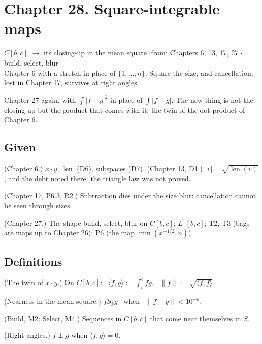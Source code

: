 \newpage

\section*{Chapter 28. Square-integrable maps}
\begin{center}
{\normalsize $C[b,c]$ $\to$ its closing-up in the mean square \quad$\cdot$\quad from: Chapters 6, 13, 17, 27 \quad$\cdot$\quad build, select, blur}\\[4pt]
{\small Chapter 6 with a stretch in place of $\{1, \dots, n\}$. Square the size, and cancellation, lost in Chapter 17, survives at right angles.}
\end{center}

Chapter 27 again, with $\int |f - g|^2$ in place of $\int |f - g|$. The new thing is not the closing-up but the product that comes with it: the twin of the dot product of Chapter 6.

\subsection*{Given}

\begin{lines}
\item[\lab{G1}] (Chapter 6.) $x \cdot y$, $\operatorname{len}$ (D6), subspaces (D7). (Chapter 13, D1.) $|v| = \sqrt{\operatorname{len}(v)}$, and the debt noted there: the triangle law was not proved.
\item[\lab{G2}] (Chapter 17, P6.3, R2.) Subtraction dies under the size blur: cancellation cannot be seen through sizes.
\item[\lab{G3}] (Chapter 27.) The shape build, select, blur on $C[b,c]$; $L^1[b,c]$; T2, T3 (bags are maps up to Chapter 26); P6 (the map $\min(x^{-1/2}, n)$).
\end{lines}

\subsection*{Definitions}

\begin{lines}
\item[\lab{D1}] (The twin of $x \cdot y$.) On $C[b,c]$: \ $\langle f, g \rangle := \int_b^c f g$. \ $\|f\| := \sqrt{\langle f, f \rangle}$.
\item[\lab{D2}] (Nearness in the mean square.) $f \mathrel{S_k} g$ \ when \ $\|f - g\| < 10^{-k}$.
\item[\lab{D3}] (Build, M2; Select, M4.) Sequences in $C[b,c]$ that come near themselves in $S$.
\item[\lab{D4}] (Right angles.) $f \perp g$ when $\langle f, g \rangle = 0$.
\end{lines}

